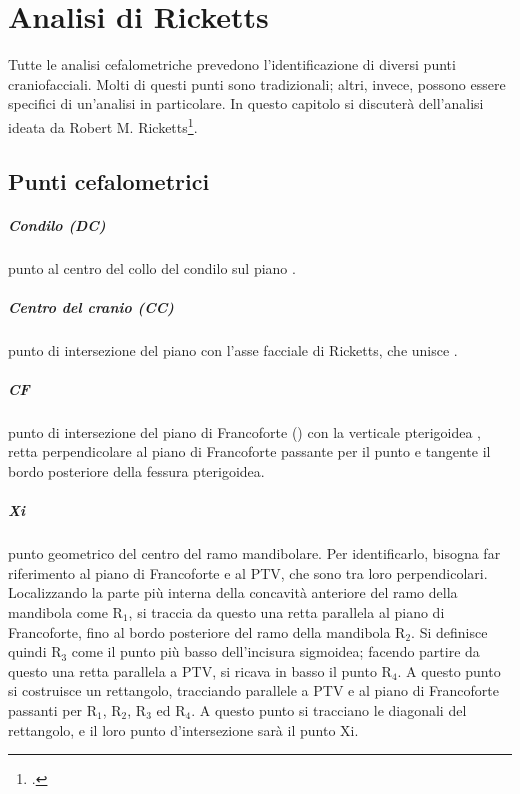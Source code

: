 \chapter{Analisi di Ricketts}

Tutte le analisi cefalometriche prevedono l'identificazione di diversi punti craniofacciali. Molti di questi punti sono tradizionali; altri, invece, possono essere specifici di un'analisi in particolare. In questo capitolo si discuterà dell'analisi ideata da Robert M. Ricketts\footcite{Ricketts1960,Ricketts1960a,Ricketts1961,Lucchese1988,Veltri2005}.

\section{Punti cefalometrici}

\paragraph{Condilo (DC)} punto al centro del collo del condilo sul piano .

\paragraph{Centro del cranio (CC)} punto di intersezione del piano  con l'asse facciale di Ricketts, che unisce .

\paragraph{CF} punto di intersezione del piano di Francoforte () con la verticale pterigoidea , retta perpendicolare al piano di Francoforte passante per il punto  e tangente il bordo posteriore della fessura pterigoidea.

\paragraph{Xi} punto geometrico del centro del ramo mandibolare. Per identificarlo, bisogna far riferimento al piano di Francoforte e al PTV, che sono tra loro perpendicolari. Localizzando la parte più interna della concavità anteriore del ramo della mandibola come R$_1$, si traccia da questo una retta parallela al piano di Francoforte, fino al bordo posteriore del ramo della mandibola R$_2$. Si definisce quindi R$_3$ come il punto più basso dell'incisura sigmoidea; facendo partire da questo una retta parallela a PTV, si ricava in basso il punto R$_4$. A questo punto si costruisce un rettangolo, tracciando parallele a PTV e al piano di Francoforte passanti per R$_1$, R$_2$, R$_3$ ed R$_4$. A questo punto si tracciano le diagonali del rettangolo, e il loro punto d'intersezione sarà il punto Xi.

